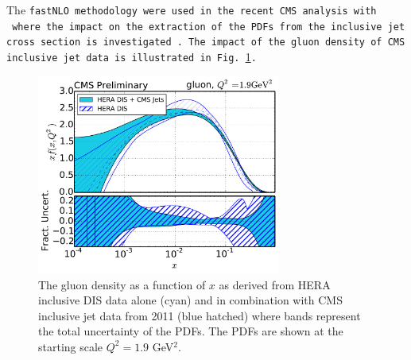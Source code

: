 \begin{description}
\begin{itemize}
The \tt fastNLO \rm methodology were used in the recent CMS analysis with \fitter\ where the impact
on the extraction of the PDFs from the inclusive jet cross section is investigated~\cite{cms:jets}. 
The impact of the gluon density of CMS inclusive jet data is illustrated in Fig.~\ref{fig:cmsjet}.
\begin{figure}[!ht]
   \centering
   \includegraphics[width=8cm]{CMSjets.pdf}
   \caption{The gluon density as a function of $x$ as derived from HERA inclusive DIS data 
            alone (cyan) and in combination with CMS inclusive jet data from 2011 (blue hatched)
            where bands represent the total uncertainty of the PDFs. 
            The PDFs are shown at the starting scale $Q^2= 1.9$ GeV$^2$.}
 \label{fig:cmsjet}
\end{figure}


\end{itemize}

\end{description}

